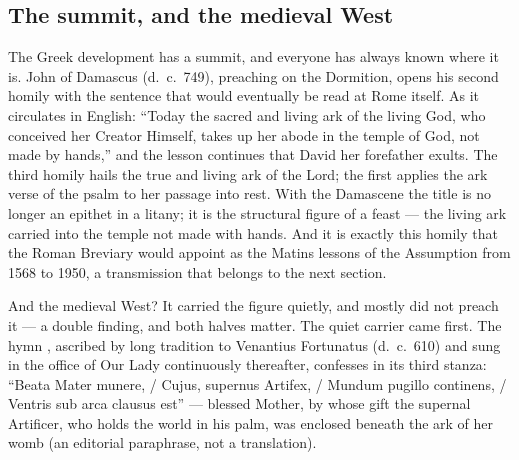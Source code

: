 \subsection{The summit, and the medieval West}

The Greek development has a summit, and everyone has always known
where it is. John of Damascus (d.~c.~749), preaching on the
Dormition, opens his second homily with the sentence that would
eventually be read at Rome itself. As it circulates in English:
``Today the sacred and living ark of the living God, who conceived
her Creator Himself, takes up her abode in the temple of God, not
made by hands,'' and the lesson continues that David her forefather
exults. The third homily hails the true and
living ark of the Lord; the first applies the ark verse of the psalm
to her passage into rest. With the Damascene the title is
no longer an epithet in a litany; it is the structural figure of a
feast --- the living ark carried into the temple not made with hands.
And it is exactly this homily that the Roman Breviary would appoint
as the Matins lessons of the Assumption from 1568 to 1950, a
transmission that belongs to the next section.

And the medieval West? It carried the figure quietly, and mostly did
not preach it --- a double finding, and both halves matter. The quiet
carrier came first. The hymn ,
ascribed by long tradition to Venantius Fortunatus (d.~c.~610) and
sung in the office of Our Lady continuously thereafter, confesses in
its third stanza: ``Beata Mater munere, / Cujus, supernus Artifex, /
Mundum pugillo continens, / Ventris sub arca clausus est'' --- blessed
Mother, by whose gift the supernal Artificer, who holds the world in
his palm, was enclosed beneath the ark of her womb (an editorial
paraphrase, not a translation).

